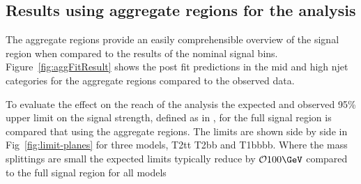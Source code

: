 \subsection{Results using aggregate regions for the \alphat analysis}

The aggregate regions provide an easily comprehensible
overview of the signal region when compared to the results
of the nominal signal bins. Figure~\ref{fig:aggFitResult} shows
the post fit predictions in the mid and high njet categories
for the aggregate regions compared to the observed data.

To evaluate the effect on the reach of the \alphat analysis the expected and observed 95\% upper limit
on the signal strength, defined as in \cite{limit-stuff}, for the full signal region 
is compared that using the aggregate regions. The limits are shown side by side
in Fig~\ref{fig:limit-planes} for three models, T2tt T2bb and T1bbbb. Where the mass
splittings are small the expected limits typically reduce by $\mathcal{O} 100\GeV$ 
compared to the full signal region for all models  

